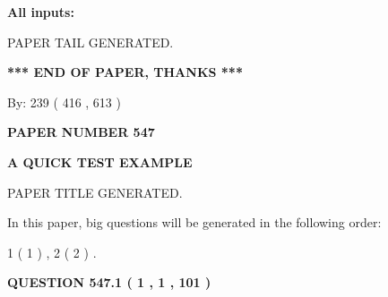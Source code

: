 \documentclass[12pt]{article}
\begin{document}
   
   
   
\noindent{}
   
   
   
   
\noindent\vspace{0.1in}\hspace{-0.08in} {\textbf{\Large{All inputs: }}}
   
   
   
   
   
   
 \vspace{0.2in}
 
   
   
\vspace{2.0in} PAPER TAIL GENERATED.
   
   
   
   
\vspace{1.0in} 
{\textbf{\large{ *** END OF PAPER, THANKS *** }}} 
   
   
\hspace{1.0in} By: 
 239 ( 416 ,  613 )
   
   
   
   
\newpage 
\setcounter{page}{ 
   547001 } 
   
   
   
   
 {\textbf{ \Large{ PAPER NUMBER  547  }}}
   
   
\vspace{0.2in}
   
   
   
   
   
   
   
   
 \vspace{0.2in}
{\LARGE {\textbf{ A QUICK TEST EXAMPLE}}}
   
   
 PAPER TITLE GENERATED.
   
   
   
\vspace{0.2in}
   
In this paper, big questions will be generated in the following order: 
   
   
   1 ( 1 )
 ,
   2 ( 2 )
 .
  
\vspace{0.2in}
  
{\textbf{\Large{QUESTION
547.1 
 ( 1 , 1 , 101 )
}}}
  
  
 
\end{document}
